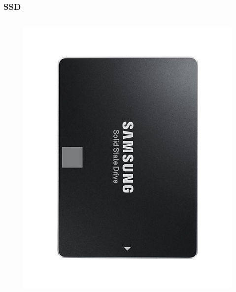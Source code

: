 \begin{frame}
	\frametitle{SSD}
	 
	\begin{columns}
		\begin{figure}[!htbp]
			\centering 
			\includegraphics[width=1.0\linewidth]{images/5_memory/ssd_info_1.png}
		\end{figure}
			

\end{columns}
\end{frame}

